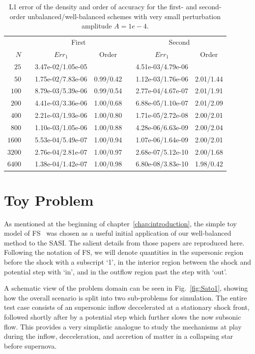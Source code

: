 \begin{table}\centering
\caption{L1 error of the density and order of accuracy for the first- and second-order unbalanced/well-balanced schemes with very small perturbation amplitude $A=1e-4$.}
\label{table:OVS_Asmall}
\begin{tabular}{@{}rcccccc@{}}\toprule
& \phantom{a} & \multicolumn{2}{c}{First} & \phantom{ab} & \multicolumn{2}{c}{Second}\\
\cmidrule{3-4} \cmidrule{6-7}
$N$ && $Err_1$ & Order && $Err_1$ & Order\\ \midrule
$25$ && 3.47e-02/1.05e-05 &&& 4.51e-03/4.79e-06 &\\
$50$ && 1.75e-02/7.83e-06 & 0.99/0.42 && 1.12e-03/1.76e-06 & 2.01/1.44\\
$100$ && 8.79e-03/5.39e-06 & 0.99/0.54 && 2.77e-04/4.67e-07 & 2.01/1.91\\
$200$ && 4.41e-03/3.36e-06 & 1.00/0.68 && 6.88e-05/1.10e-07 & 2.01/2.09\\
$400$ && 2.21e-03/1.93e-06 & 1.00/0.80 && 1.71e-05/2.72e-08 & 2.00/2.01\\
$800$ && 1.10e-03/1.05e-06 & 1.00/0.88 && 4.28e-06/6.63e-09 & 2.00/2.04\\
$1600$ && 5.53e-04/5.49e-07 & 1.00/0.94 && 1.07e-06/1.64e-09 & 2.00/2.01\\
$3200$ && 2.76e-04/2.81e-07 & 1.00/0.97 && 2.68e-07/5.12e-10 & 2.00/1.68\\
$6400$ && 1.38e-04/1.42e-07 & 1.00/0.98 && 6.80e-08/3.83e-10 & 1.98/0.42\\
\bottomrule
\end{tabular}
\end{table}


\section{Toy Problem}
\label{sec:toyProblem}

As mentioned at the beginning of chapter~\ref{chap:introduction}, the simple toy model of FS~\cite{Foglizzo2009,Sato2009} was chosen as a useful initial application of our well-balanced method to the SASI. The salient details from those papers  are reproduced here. Following the notation of FS, we will denote quantities in the supersonic region before the shock with a subscript `1', in the interior region between the shock and potential step with `in', and in the outflow region past the step with `out'.

A schematic view of the problem domain can be seen in Fig.~\ref{fig:Sato1}, showing how the overall scenario is split into two sub-problems for simulation. The entire test case consists of an supersonic inflow deccelerated at a stationary shock front, followed shortly after by a potential step which further slows the now subsonic flow. This provides a very simplistic analogue to study the mechanisms at play during the inflow, decceleration, and accretion of matter in a collapsing star before supernova.

